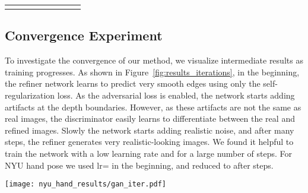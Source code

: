 \documentclass[10pt,twocolumn,letterpaper]{article}
\begin{document}
\begin{figure*}
\begin{tabular}{cccccccc}
\hline  \\
\end{tabular}
\caption{Qualitative results for automatic refinement of NYU hand depth images. The top row (in each set of two rows) shows the synthetic hand image, and the bottom row is the corresponding refined image. Note how realistic the depth boundaries are compared to real images in Figure~\ref{fig:ex_real_nyu_hand}.}
\label{fig:more_results_qualitative_hand}
\end{figure*}

\subsection*{Convergence Experiment}
To investigate the convergence of our method, we visualize intermediate results as training progresses. 
As shown in Figure~\ref{fig:results_iterations}, in the beginning, the refiner network learns to predict very smooth edges using only the self-regularization loss. 
As the adversarial loss is enabled, the network starts adding artifacts at the depth boundaries. 
However, as these artifacts are not the same as real images, the discriminator easily learns to differentiate between the real and refined images. 
Slowly the network starts adding realistic noise, and after many steps, the refiner generates very realistic-looking images. 
We found it helpful to train the network with a low learning rate and for a large number of steps. 
For NYU hand pose we used lr= in the beginning, and reduced to  after  steps.


\begin{figure*}
\centering
\texttt{[image: nyu\_hand\_results/gan\_iter.pdf]} 
\caption{
SimGAN output as a function of training iterations for NYU hand pose.  
Columns correspond to increasing training iterations. 
First row shows synthetic images, and the second row shows corresponding refined images.
The first column is the result of training with  image difference for  steps; the later rows show the result when trained on top of this model. 
In the beginning the adversarial part of the cost introduces different kinds of unrealistic noise to try beat the adversarial network . 
As the dueling between  and  progresses,  learns to model the right kind of noise.}
\vspace{0.2cm}
\label{fig:results_iterations}
\end{figure*}
 
\end{document}
